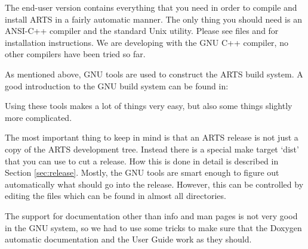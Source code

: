 The end-user version contains everything that you need in order to
compile and install ARTS in a fairly automatic manner. The only
thing you should need is an ANSI-C++ compiler and the standard Unix
 utility. Please see files  and
 for installation instructions. We are developing
with the GNU C++ compiler, no other compilers have been tried so
far.


As mentioned above, GNU tools are used to construct the ARTS
build system. A good introduction to the GNU build system can be found in:
\begin{quote}
  \footnotesize
\end{quote}
Using these tools makes a lot of things very easy, but also some
things slightly more complicated.

The most important thing to keep in mind is that an ARTS release
is not just a copy of the ARTS development tree. Instead there is a
special make target `dist' that you can use to cut a release. How this
is done in detail is described in Section \ref{sec:release}. Mostly,
the GNU tools are smart enough to figure out automatically what should
go into the release. However, this can be controlled by editing the
 files which can be found in almost all directories.

The support for documentation other than info and man pages is not
very good in the GNU system, so we had to use some tricks to make sure
that the Doxygen automatic documentation and the User Guide work as they
should. 



%
%


